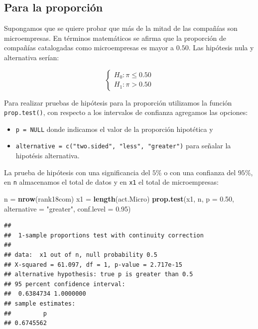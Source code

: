 \documentclass[
]{krantz}
\makeatletter
\newenvironment{Shaded}{\begin{snugshade}}{\end{snugshade}}
\newcommand{\DataTypeTok}[1]{\textcolor[rgb]{0.27,0.27,0.27}{#1}}
\newcommand{\FloatTok}[1]{\textcolor[rgb]{0.06,0.06,0.06}{#1}}
\newcommand{\KeywordTok}[1]{\textcolor[rgb]{0.27,0.27,0.27}{\textbf{#1}}}
\newcommand{\NormalTok}[1]{#1}
\newcommand{\StringTok}[1]{\textcolor[rgb]{0.5,0.5,0.5}{#1}}
\providecommand{\tightlist}{%
  \setlength{\itemsep}{0pt}\setlength{\parskip}{0pt}}
\newenvironment{kframe}{%
\medskip{}
\setlength{\fboxsep}{.8em}
 \def\at@end@of@kframe{}%
 \ifinner\ifhmode%
  \def\at@end@of@kframe{\end{minipage}}%
  \begin{minipage}{\columnwidth}%
 \fi\fi%
 \def\FrameCommand##1{\hskip\@totalleftmargin \hskip-\fboxsep
 \colorbox{shadecolor}{##1}\hskip-\fboxsep
     \hskip-\linewidth \hskip-\@totalleftmargin \hskip\columnwidth}%
 \MakeFramed {\advance\hsize-\width
   \@totalleftmargin\z@ \linewidth\hsize
   \@setminipage}}%
 {\par\unskip\endMakeFramed%
 \at@end@of@kframe}
\renewenvironment{Shaded}{\begin{kframe}}{\end{kframe}}
\makeatother
\begin{document}
\hypertarget{para-la-proporcion-1}{%
\subsection{Para la proporción}\label{para-la-proporcion-1}}

Supongamos que se quiere probar que más de la mitad de las compañías son microempresas. En términos matemáticos se afirma que la proporción de compañías catalogadas como microempresas es mayor a \(0.50\). Las hipótesis nula y alternativa serían:

\begin{equation} 
\begin{cases} 
H_0: \pi \leq 0.50 \\ 
H_1: \pi > 0.50
\end{cases} 
\end{equation}

Para realizar pruebas de hipótesis para la proporción utilizamos la función \texttt{prop.test()}, con respecto a los intervalos de confianza agregamos las opciones:

\begin{itemize}
\tightlist
\item
  \texttt{p\ =\ NULL} donde indicamos el valor de la proporción hipotética y
\item
  \texttt{alternative\ =\ c("two.sided",\ "less",\ "greater")} para señalar la hipotésis alternativa.
\end{itemize}

La prueba de hipótesis con una significancia del \(5\%\) o con una confianza del \(95\)\%, en \texttt{n} almacenamos el total de datos y en \texttt{x1} el total de microempresas:

\begin{Shaded}
\begin{Highlighting}[]
\NormalTok{n =}\StringTok{ }\KeywordTok{nrow}\NormalTok{(rank18com)}
\NormalTok{x1 =}\StringTok{ }\KeywordTok{length}\NormalTok{(act.Micro)}
\KeywordTok{prop.test}\NormalTok{(x1, n, }\DataTypeTok{p =} \FloatTok{0.50}\NormalTok{, }\DataTypeTok{alternative =} \StringTok{"greater"}\NormalTok{,  }\DataTypeTok{conf.level =} \FloatTok{0.95}\NormalTok{)}
\end{Highlighting}
\end{Shaded}

\begin{verbatim}
## 
##  1-sample proportions test with continuity correction
## 
## data:  x1 out of n, null probability 0.5
## X-squared = 61.097, df = 1, p-value = 2.717e-15
## alternative hypothesis: true p is greater than 0.5
## 95 percent confidence interval:
##  0.6384734 1.0000000
## sample estimates:
##         p 
## 0.6745562
\end{verbatim}
\end{document}
